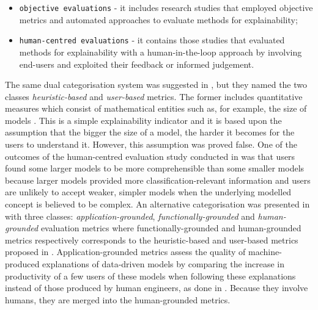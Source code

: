 \documentclass[final,1p,times]{elsarticle}
\begin{document}
\begin{itemize}
\item {\verb|objective evaluations|} - it includes research studies that employed objective metrics and automated approaches to evaluate methods for explainability;
\item {\verb|human-centred evaluations|} - it contains those studies that evaluated methods for explainability with a human-in-the-loop approach by involving end-users and exploited their feedback or informed judgement.
\end{itemize}


The same dual categorisation system was suggested in \cite{bibal2016interpretability}, but they named the two classes \textit{heuristic-based} and \textit{user-based} metrics. The former includes quantitative measures which consist of mathematical entities such as, for example, the size of models \cite{dam2018explainable, freitas2014comprehensible, gacto2011interpretability, garcia2009study, otero2016improving}. 
This is a simple explainability indicator and it is based upon the assumption that the bigger the size of a model, the harder it becomes for the users to understand it. However, this assumption was proved false. One of the outcomes of the human-centred evaluation study conducted in \cite{freitas2014comprehensible} was that users found some larger models to be more comprehensible than some smaller models because larger models provided more classification-relevant information and users are unlikely to accept weaker, simpler models when the underlying modelled concept is believed to be complex.
An alternative categorisation was presented in \cite{preece2018asking} with three classes: \textit{application-grounded}, \textit{functionally-grounded} and \textit{human-grounded} evaluation metrics where functionally-grounded and human-grounded metrics respectively corresponds to the heuristic-based and user-based metrics proposed in \cite{bibal2016interpretability}. Application-grounded metrics assess the quality of machine-produced explanations of data-driven models by comparing the increase in productivity of a few users of these models when following these explanations instead of those produced by human engineers, as done in \cite{dam2018explainable, preece2018asking}. Because they involve humans, they are merged into the human-grounded metrics. 
\end{document}
